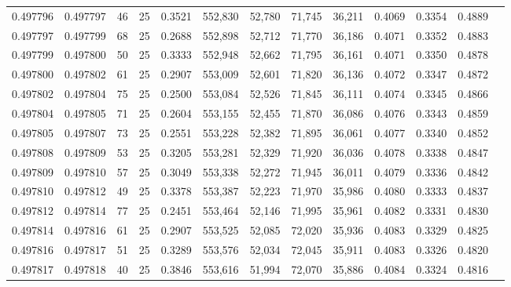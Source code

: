 \begin{tabular}{rrrrrrrrrrrrr}
0.497796 & 0.497797 &    46 &  25 &                                     0.3521 & 552,830 &  52,780 &  71,745 &  36,211 & 0.4069 & 0.3354 & 0.4889 \\
0.497797 & 0.497799 &    68 &  25 &                                     0.2688 & 552,898 &  52,712 &  71,770 &  36,186 & 0.4071 & 0.3352 & 0.4883 \\
0.497799 & 0.497800 &    50 &  25 &                                     0.3333 & 552,948 &  52,662 &  71,795 &  36,161 & 0.4071 & 0.3350 & 0.4878 \\
0.497800 & 0.497802 &    61 &  25 &                                     0.2907 & 553,009 &  52,601 &  71,820 &  36,136 & 0.4072 & 0.3347 & 0.4872 \\
0.497802 & 0.497804 &    75 &  25 &                                     0.2500 & 553,084 &  52,526 &  71,845 &  36,111 & 0.4074 & 0.3345 & 0.4866 \\
0.497804 & 0.497805 &    71 &  25 &                                     0.2604 & 553,155 &  52,455 &  71,870 &  36,086 & 0.4076 & 0.3343 & 0.4859 \\
0.497805 & 0.497807 &    73 &  25 &                                     0.2551 & 553,228 &  52,382 &  71,895 &  36,061 & 0.4077 & 0.3340 & 0.4852 \\
0.497808 & 0.497809 &    53 &  25 &                                     0.3205 & 553,281 &  52,329 &  71,920 &  36,036 & 0.4078 & 0.3338 & 0.4847 \\
0.497809 & 0.497810 &    57 &  25 &                                     0.3049 & 553,338 &  52,272 &  71,945 &  36,011 & 0.4079 & 0.3336 & 0.4842 \\
0.497810 & 0.497812 &    49 &  25 &                                     0.3378 & 553,387 &  52,223 &  71,970 &  35,986 & 0.4080 & 0.3333 & 0.4837 \\
0.497812 & 0.497814 &    77 &  25 &                                     0.2451 & 553,464 &  52,146 &  71,995 &  35,961 & 0.4082 & 0.3331 & 0.4830 \\
0.497814 & 0.497816 &    61 &  25 &                                     0.2907 & 553,525 &  52,085 &  72,020 &  35,936 & 0.4083 & 0.3329 & 0.4825 \\
0.497816 & 0.497817 &    51 &  25 &                                     0.3289 & 553,576 &  52,034 &  72,045 &  35,911 & 0.4083 & 0.3326 & 0.4820 \\
0.497817 & 0.497818 &    40 &  25 &                                     0.3846 & 553,616 &  51,994 &  72,070 &  35,886 & 0.4084 & 0.3324 & 0.4816 \\

\end{tabular}
